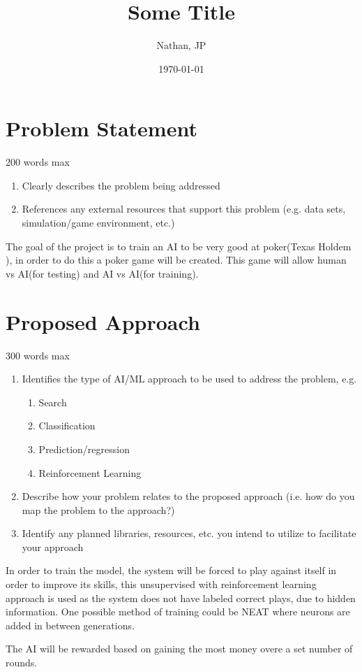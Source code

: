 \documentclass[11pt]{article}
\title{Some Title}
\author{Nathan, JP}
\date{\today}
\begin{document}
\maketitle
\section{Problem Statement}
200 words max
\begin{enumerate}
\item Clearly describes the problem being addressed
\item References any external resources that support this problem (e.g. data sets, simulation/game environment,
  etc.)
\end{enumerate}

The goal of the project is to train an AI to be very good at poker(Texas Holdem \cite{TexasHoldEm}), in order to do this a poker
game will be created. This game will allow human vs AI(for testing) and AI vs AI(for training).

\section{Proposed Approach}
300 words max
\begin{enumerate}
\item Identifies the type of AI/ML approach to be used to address the problem, e.g.
  \begin{enumerate}
  \item Search
  \item Classification
  \item Prediction/regression
  \item Reinforcement Learning
  \end{enumerate}
\item Describe how your problem relates to the proposed approach (i.e. how do you map the problem to the
  approach?)
\item Identify any planned libraries, resources, etc. you intend to utilize to facilitate your approach
\end{enumerate}
In order to train the model, the system will be forced to play against itself in order to improve its skills,
this unsupervised with reinforcement learning approach is used as the system does not have labeled correct plays,
due to hidden information. One possible method of training could be NEAT\cite{NEAT} where neurons are added in
between generations.

The AI will be rewarded based on gaining the most money overe a set number of rounds. 
\end{document}
